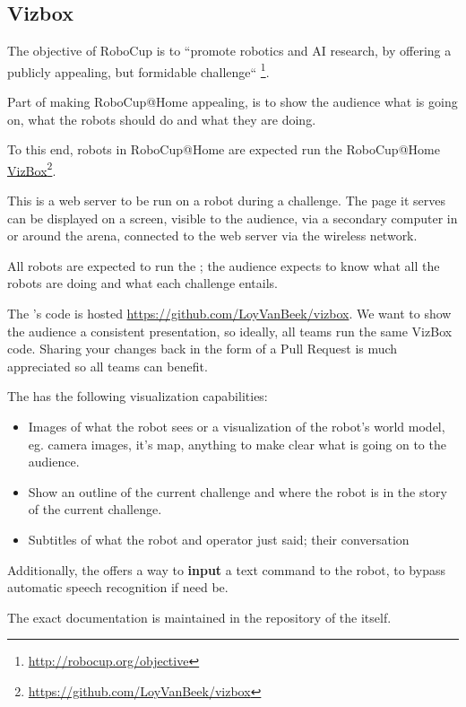 \subsection{Vizbox}
\label{vizbox}

The objective of RoboCup is to ``promote robotics and AI research, by offering a publicly appealing, but formidable challenge`` \footnote{\url{http://robocup.org/objective}}. 

Part of making RoboCup@Home appealing, is to show the audience what is going on, what the robots should do and what they are doing. 

To this end, robots in RoboCup@Home are expected run the RoboCup@Home \href{https://github.com/LoyVanBeek/vizbox}{VizBox}\footnote{\url{https://github.com/LoyVanBeek/vizbox}}. 

This is a web server to be run on a robot during a challenge. The page it serves can be displayed on a screen, visible to the audience, via a secondary computer in or around the arena, connected to the web server via the wireless network. 

All robots are expected to run the ; the audience expects to know what all the robots are doing and what each challenge entails. 

The 's code is hosted \url{https://github.com/LoyVanBeek/vizbox}. 
We want to show the audience a consistent presentation, so ideally, all teams run the same VizBox code. 
Sharing your changes back in the form of a Pull Request is much appreciated so all teams can benefit. 

The  has the following visualization capabilities:
\begin{itemize}
	\item Images of what the robot sees or a visualization of the robot's world model, eg. camera images, it's map, anything to make clear what is going on to the audience.
	\item Show an outline of the current challenge and where the robot is in the story of the current challenge.
	\item Subtitles of what the robot and operator just said; their conversation
\end{itemize}

Additionally, the  offers a way to \textbf{input} a text command to the robot, to bypass automatic speech recognition if need be. 

The exact documentation is maintained in the repository of the  itself. 